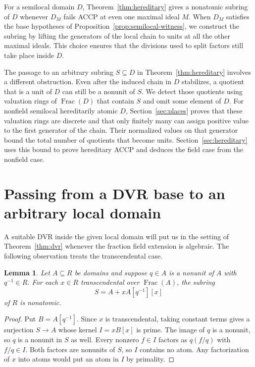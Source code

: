 \documentclass[11pt, letterpaper]{article}
\newtheorem{lemma}[theorem]{Lemma}
\theoremstyle{definition}
\theoremstyle{remark}
\DeclareMathOperator{\Frac}{Frac}
\begin{document}
For a semilocal domain $D$, Theorem~\ref{thm:hereditary} gives a nonatomic subring of $D$ whenever $D_M$ fails ACCP at even one maximal ideal $M$.
When $D_M$ satisfies the base hypotheses of Proposition~\ref{prop:semilocal-witness}, we construct the subring by lifting the generators of the local chain to units at all the other maximal ideals.
This choice ensures that the divisions used to split factors still take place inside $D$.

The passage to an arbitrary subring $S \subseteq D$ in Theorem~\ref{thm:hereditary} involves a different obstruction.
Even after the induced chain in $D$ stabilizes, a quotient that is a unit of $D$ can still be a nonunit of $S$.
We detect those quotients using valuation rings of $\Frac(D)$ that contain $S$ and omit some element of $D$.
For nonfield semilocal hereditarily atomic $D$, Section~\ref{sec:places} proves that these valuation rings are discrete and that only finitely many can assign positive value to the first generator of the chain.
Their normalized values on that generator bound the total number of quotients that become units.
Section~\ref{sec:hereditary} uses this bound to prove hereditary ACCP and deduces the field case from the nonfield case.

\section{Passing from a DVR base to an arbitrary local domain}
\label{sec:arbitrary-local}

A suitable DVR inside the given local domain will put us in the setting of Theorem~\ref{thm:dvr} whenever the fraction field extension is algebraic.
The following observation treats the transcendental case.

\begin{lemma}
    \label{lem:transcendental-witness}
    Let $A \subseteq R$ be domains and suppose $q \in A$ is a nonunit of $A$ with $q^{-1} \in R$.
    For each $x \in R$ transcendental over $\Frac(A)$, the subring
    \[
        S = A + xA[q^{-1}][x]
    \]
    of $R$ is nonatomic.
\end{lemma}

\begin{proof}
    Put $B = A[q^{-1}]$.
    Since $x$ is transcendental, taking constant terms gives a surjection $S \to A$ whose kernel $I = xB[x]$ is prime.
    The image of $q$ is a nonunit, so $q$ is a nonunit in $S$ as well.
    Every nonzero $f \in I$ factors as $q(f/q)$ with $f/q \in I$.
    Both factors are nonunits of $S$, so $I$ contains no atom.
    Any factorization of $x$ into atoms would put an atom in $I$ by primality.
\end{proof}
\end{document}
